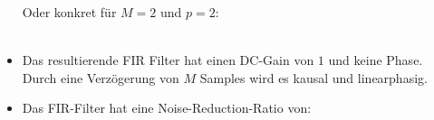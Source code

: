\begin{itemize}
		 Oder konkret für $M=2$ und $p=2$:\\[0.2cm]
		 \\[-0.15cm]
		 \item Das resultierende FIR Filter hat einen DC-Gain von $1$ und keine Phase. Durch eine Verzögerung von $M$ Samples wird es kausal und linearphasig.\\[-0.45cm]
		 \item Das FIR-Filter hat eine Noise-Reduction-Ratio von:\\[0.2cm]
		\end{itemize}

\newpage
